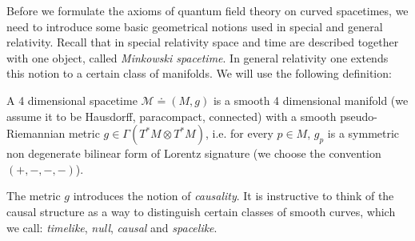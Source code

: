\documentclass[12pt]{article}
\newcommand{\Mcal}{\mathcal{M}}
\newcommand{\RR}{\mathbb{R}}           %
\newcommand{\al}{\alpha}
\newcommand{\1}{\mathds{1}}                         %
\begin{document}
Before we formulate the axioms of quantum field theory on curved spacetimes, we need to introduce some basic geometrical notions used in special and general relativity. Recall that in special relativity space and time are described together with one object, called \textit{Minkowski spacetime}. In general relativity one extends this notion to a certain class of manifolds. We will use the following definition:
\begin{df}
A 4 dimensional spacetime $\Mcal\doteq(M,g)$ is a smooth 4 dimensional manifold (we assume it to be Hausdorff, paracompact, connected) with a smooth pseudo-Riemannian metric $g\in\Gamma(T^*M\otimes T^*M)$, i.e. for every $p\in M$, $g_p$ is a symmetric non degenerate bilinear form of Lorentz signature (we choose the convention $(+,-,-,-)$).
\end{df}
The metric $g$ introduces the notion of \textit{causality}. It is instructive to think of the causal structure as a way to distinguish certain classes of smooth curves, which we call: \textit{timelike}, \textit{null}, \textit{causal} and \textit{spacelike}.
\end{document}
